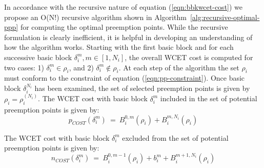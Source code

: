 \noindent
In accordance with the recursive nature of equation (\ref{eqn:bbkwcet-cost}) we propose an O(N!) recursive algorithm shown in Algorithm~\ref{alg:recursive-optimal-ppp} for computing the optimal preemption points.  While the recursive formulation is clearly inefficient, it is helpful in developing an understanding of how the algorithm works.  Starting with the first basic block and for each successive basic block \begin{math}\delta_{i}^{m}, m \in [1,N_{i}]\end{math}, the overall WCET cost is computed for two cases: 1) \begin{math}\delta_{i}^{m} \in \rho_{i}\end{math}, and 2) \begin{math}\delta_{i}^{m} \not\in \rho_{i}\end{math}.  At each step of the algorithm the set \begin{math}\rho_{i}\end{math} must conform to the constraint of equation (\ref{eqn:pp-constraint}).  Once basic block \begin{math}\delta_{i}^{N_{i}}\end{math} has been examined, the set of selected preemption points is given by \begin{math}\rho_{i} = \rho_{i}^{(N_{i})}\end{math}.  The WCET cost with basic block \begin{math}\delta_{i}^{m}\end{math} included in the set of potential preemption points is given by:
\begin{equation}\label{eqn:pcost-bb}
p_{COST}(\delta_{i}^{m})\ =\ B_{i}^{0,m}(\rho_{i}) + B_{i}^{m,N_{i}}(\rho_{i})
\end{equation}

The WCET cost with basic block \begin{math}\delta_{i}^{m}\end{math} excluded from the set of potential preemption points is given by:
\begin{equation}\label{eqn:npcost-bb}
n_{COST}(\delta_{i}^{m})\ =\ B_{i}^{0,m-1}(\rho_{i}) + b_{i}^{m} + B_{i}^{m+1,N_{i}}(\rho_{i})
\end{equation}

